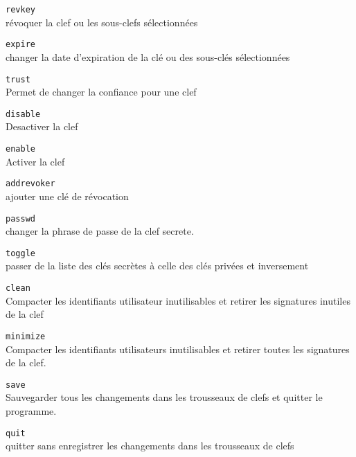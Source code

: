               

               \texttt{revkey }\\ 
               révoquer la clef ou les sous-clefs sélectionnées


               \texttt{expire }\\ 
              changer la date d'expiration de la clé ou des sous-clés sélectionnées

               \texttt{trust  }\\ 
              Permet de changer la confiance pour une clef
              
            

               \texttt{disable }\\ 
              Desactiver la clef

               \texttt{enable }\\ 
              Activer la clef
              
               \texttt{addrevoker}\\ 
                     ajouter une clé de révocation

               \texttt{passwd }\\ 
              changer la phrase de passe de la clef secrete.


               \texttt{toggle }\\ 
               passer de la liste des clés secrètes à celle des clés privées
               et inversement


               \texttt{clean }\\ 
               Compacter les identifiants utilisateur inutilisables et retirer les signatures inutiles de la clef

               \texttt{minimize}\\ 
                     Compacter les identifiants utilisateurs inutilisables et retirer toutes les signatures de la clef.


            

               \texttt{save   }\\ 
        
               Sauvegarder tous les changements dans les trousseaux de clefs et quitter le programme.

               \texttt{quit   }\\ 
              quitter sans enregistrer les changements dans les trousseaux de clefs\\
              
